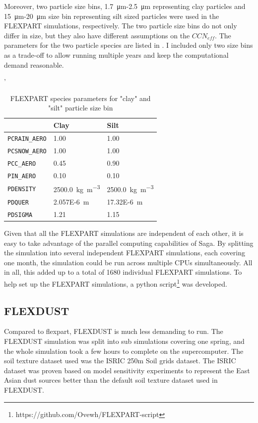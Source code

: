 Moreover, two particle size bins, \SI{1.7}{\micro\metre}-\SI{2.5}{\micro\metre} representing clay particles and  \SI{15}{\micro\metre}-\SI{20}{\micro\metre} size bin representing silt sized particles were used in the FLEXPART simulations, respectively. 
The two particle size bins do not only differ in size, but they also have different assumptions on the $CCN_{eff}$. 
The parameters for the two particle species are listed in . 
I included only two size bins as a trade-off to allow running multiple years and keep the computational demand reasonable.  
 
\begin{table}[htpb]
\caption{FLEXPART species parameters for "clay" and "silt" particle size bin}
\label{tab:particle_params}'
\centering
\begin{tabular}{@{}lll@{}}
\toprule
 & Clay  & Silt \\ \midrule
\verb|PCRAIN_AERO| & 1.00  & 1.00 \\
\verb|PCSNOW_AERO| & 1.00  &  1.00 \\
\verb|PCC_AERO| & 0.45 \parencite{flexdust_ref_2016}   &  0.90\parencite{flexdust_ref_2016} \\
\verb|PIN_AERO| & 0.10 \parencite{flexdust_ref_2016} & 0.10 \parencite{flexdust_ref_2016} \\
\verb|PDENSITY| & \SI{2500.0}{\kg\per\cubic\metre}    & \SI{2500.0}{\kg\per\cubic\metre} \\
\verb|PDQUER| & \SI{2.057E-6}{\metre}    &  \SI{17.32E-6}{\metre}   \\
\verb|PDSIGMA| & 1.21   &  1.15    \\ \bottomrule
\end{tabular}%
\end{table}
 
Given that all the FLEXPART simulations are independent of each other, it is easy to take advantage of the parallel computing capabilities of Saga. By splitting the simulation into several independent FLEXPART simulations, each covering one month, the simulation could be run across multiple CPUs simultaneously.
All in all, this added up to a total of 1680 individual FLEXPART simulations.
To help set up the FLEXPART simulations, a python script\footnote{https://github.com/Ovewh/FLEXPART-script} was developed. 

\subsection{FLEXDUST}
Compared to \acrshort{flexpart}, FLEXDUST is much less demanding to run. 
The FLEXDUST simulation was split into sub simulations covering one spring, and the whole simulation took a few hours to complete on the supercomputer. 
The soil texture dataset used was the ISRIC 250m Soil grids dataset. 
The ISRIC dataset was proven based on model sensitivity experiments to represent the East Asian dust sources better than the default soil texture dataset used in FLEXDUST.      

